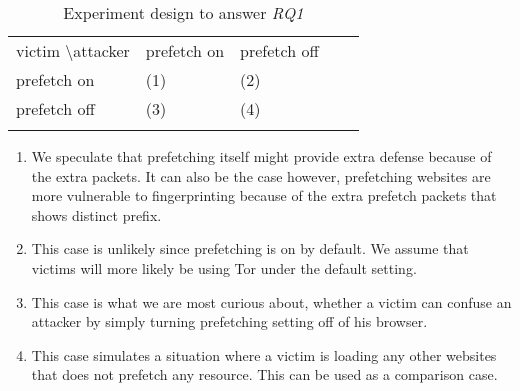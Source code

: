 \begin{table}[]
\centering
\caption{Experiment design to answer {\it RQ1}}
\label{table:prefetch}
\begin{tabular}{lllll}
\cline{1-3}
\multicolumn{1}{|l|}{victim \textbackslash attacker} & \multicolumn{1}{l|}{prefetch on} & \multicolumn{1}{l|}{prefetch off} &  &  \\ \cline{1-3}
\multicolumn{1}{|l|}{prefetch on}                    & \multicolumn{1}{l|}{(1)}         & \multicolumn{1}{l|}{(2)}          &  &  \\ \cline{1-3}
\multicolumn{1}{|l|}{prefetch off}                   & \multicolumn{1}{l|}{(3)}         & \multicolumn{1}{l|}{(4)}          &  &  \\ \cline{1-3}
                                                     &                                  &                                   &  & 
\end{tabular}                  
\end{table}

\begin{enumerate}
\item
We speculate that prefetching itself might provide extra defense because of the extra packets.
It can also be the case however, prefetching websites are more vulnerable to fingerprinting because of the extra prefetch packets that shows distinct prefix.
\item
This case is unlikely since prefetching is on by default. We assume that victims will more likely be using Tor under the default setting.
\item
This case is what we are most curious about, whether a victim can confuse an attacker by simply turning prefetching setting off of his browser.
\item
This case simulates a situation where a victim is loading any other websites that does not prefetch any resource.
This can be used as a comparison case.
\end{enumerate}
